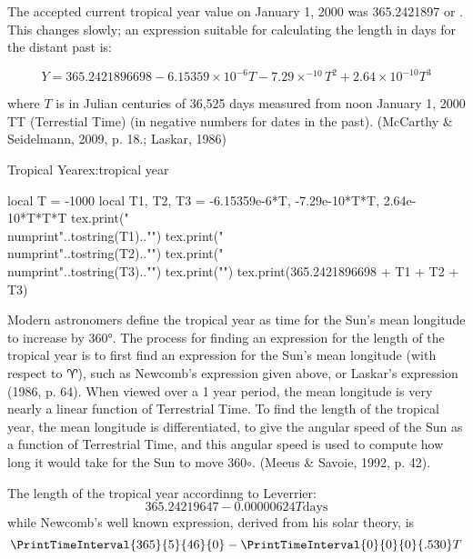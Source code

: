 The accepted current tropical year value on January 1, 2000 was 365.2421897 or  . This changes slowly; an expression suitable for calculating the length in days for the distant past is:

\begin{equation}
Y = 365.2421896698 - 6.15359\times10^{-6}T- 7.29\times^{-10} T^2 + 2.64 \times10^{-10} T^3
\end{equation}

where $T$ is in Julian centuries of 36,525 days measured from noon January 1, 2000 TT (Terrestial Time) (in negative numbers for dates in the past). (McCarthy \& Seidelmann, 2009, p. 18.; Laskar, 1986)

\begin{texexample}{Tropical Year}{ex:tropical year}
\begin{luacode*}
local T = -1000
local T1, T2, T3 = -6.15359e-6*T, -7.29e-10*T*T, 2.64e-10*T*T*T
tex.print("\\numprint{"..tostring(T1).."}")
tex.print("\\numprint{"..tostring(T2).."}")
tex.print("\\numprint{"..tostring(T3).."}")
tex.print("")
tex.print(365.2421896698 + T1 + T2 + T3)
\end{luacode*}
\end{texexample}


Modern astronomers define the tropical year as time for the Sun's mean longitude to increase by 360°. The process for finding an expression for the length of the tropical year is to first find an expression for the Sun's mean longitude (with respect to {\panunicode ♈}), such as Newcomb's expression given above, or Laskar's expression (1986, p. 64). When viewed over a 1 year period, the mean longitude is very nearly a linear function of Terrestrial Time. To find the length of the tropical year, the mean longitude is differentiated, to give the angular speed of the Sun as a function of Terrestrial Time, and this angular speed is used to compute how long it would take for the Sun to move 360$\circ$. (Meeus \& Savoie, 1992, p. 42).

The length of the tropical year accordinng to Leverrier:
\begin{equation}
365.24219647 - 0.00000624 T \text{days}
\end{equation}
while Newcomb's well known expression, derived from his solar theory, is
\begin{equation}
\PrintTimeInterval {365}{5}{46}{0} - \PrintTimeInterval {0}{0}{0}{.530}T
\end{equation}

